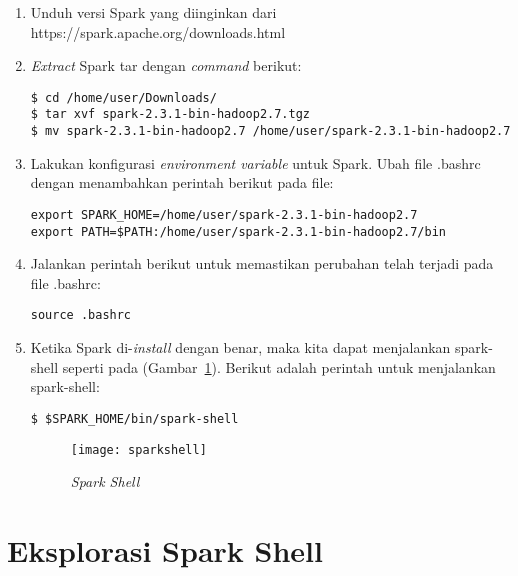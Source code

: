 \begin{enumerate}

\item Unduh versi Spark yang diinginkan  dari https://spark.apache.org/downloads.html

\item \textit{Extract} Spark tar dengan \textit{command} berikut:

\begin{verbatim}
$ cd /home/user/Downloads/ 
$ tar xvf spark-2.3.1-bin-hadoop2.7.tgz 
$ mv spark-2.3.1-bin-hadoop2.7 /home/user/spark-2.3.1-bin-hadoop2.7 
\end{verbatim}

\item Lakukan konfigurasi \textit{environment variable} untuk Spark. Ubah file .bashrc dengan menambahkan perintah berikut pada file:

\begin{verbatim}
export SPARK_HOME=/home/user/spark-2.3.1-bin-hadoop2.7
export PATH=$PATH:/home/user/spark-2.3.1-bin-hadoop2.7/bin
\end{verbatim}

\item Jalankan perintah berikut untuk memastikan perubahan telah terjadi pada file .bashrc:

\begin{verbatim}
source .bashrc
\end{verbatim}

\item Ketika Spark di-\textit{install} dengan benar, maka kita dapat menjalankan spark-shell seperti pada (Gambar~\ref{fig:sparkshell}). Berikut adalah perintah untuk menjalankan spark-shell:

\begin{verbatim}
$ $SPARK_HOME/bin/spark-shell
\end{verbatim}

\begin{figure}[H]
    \centering  
    \texttt{[image: sparkshell]}  
    \caption[{\it Spark Shell} ]{{\it Spark Shell}} 
    \label{fig:sparkshell} 
\end{figure}

\end{enumerate}


\section{Eksplorasi Spark Shell}

